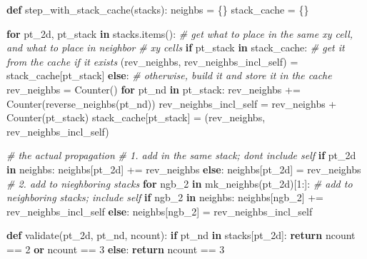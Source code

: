 \documentclass[]{article}
\newenvironment{Shaded}{}{}
\newcommand{\CommentTok}[1]{\textcolor[rgb]{0.38,0.63,0.69}{\textit{#1}}}
\newcommand{\ControlFlowTok}[1]{\textcolor[rgb]{0.00,0.44,0.13}{\textbf{#1}}}
\newcommand{\DecValTok}[1]{\textcolor[rgb]{0.25,0.63,0.44}{#1}}
\newcommand{\KeywordTok}[1]{\textcolor[rgb]{0.00,0.44,0.13}{\textbf{#1}}}
\newcommand{\NormalTok}[1]{#1}
\newcommand{\OperatorTok}[1]{\textcolor[rgb]{0.40,0.40,0.40}{#1}}
\begin{document}
\begin{Shaded}
\begin{Highlighting}[]
\KeywordTok{def}\NormalTok{ step\_with\_stack\_cache(stacks):}
\NormalTok{    neighbs }\OperatorTok{=}\NormalTok{ \{\}}
\NormalTok{    stack\_cache }\OperatorTok{=}\NormalTok{ \{\}}

    \ControlFlowTok{for}\NormalTok{ pt\_2d, pt\_stack }\KeywordTok{in}\NormalTok{ stacks.items():}
        \CommentTok{\# get what to place in the same xy cell, and what to place in neighbor}
        \CommentTok{\# xy cells}
        \ControlFlowTok{if}\NormalTok{ pt\_stack }\KeywordTok{in}\NormalTok{ stack\_cache:}
            \CommentTok{\# get it from the cache if it exists}
\NormalTok{            (rev\_neighbs, rev\_neighbs\_incl\_self) }\OperatorTok{=}\NormalTok{ stack\_cache[pt\_stack]}
        \ControlFlowTok{else}\NormalTok{:}
            \CommentTok{\# otherwise, build it and store it in the cache}
\NormalTok{            rev\_neighbs }\OperatorTok{=}\NormalTok{ Counter()}
            \ControlFlowTok{for}\NormalTok{ pt\_nd }\KeywordTok{in}\NormalTok{ pt\_stack:}
\NormalTok{                rev\_neighbs }\OperatorTok{+=}\NormalTok{ Counter(reverse\_neighbs(pt\_nd))}
\NormalTok{            rev\_neighbs\_incl\_self }\OperatorTok{=}\NormalTok{ rev\_neighbs }\OperatorTok{+}\NormalTok{ Counter(pt\_stack)}
\NormalTok{            stack\_cache[pt\_stack] }\OperatorTok{=}\NormalTok{ (rev\_neighbs, rev\_neighbs\_incl\_self)}

        \CommentTok{\# the actual propagation}
        \CommentTok{\# 1. add in the same stack; don\textquotesingle{}t include self}
        \ControlFlowTok{if}\NormalTok{ pt\_2d }\KeywordTok{in}\NormalTok{ neighbs:}
\NormalTok{            neighbs[pt\_2d] }\OperatorTok{+=}\NormalTok{ rev\_neighbs}
        \ControlFlowTok{else}\NormalTok{:}
\NormalTok{            neighbs[pt\_2d] }\OperatorTok{=}\NormalTok{ rev\_neighbs}
        \CommentTok{\# 2. add to nieghboring stacks}
        \ControlFlowTok{for}\NormalTok{ ngb\_2 }\KeywordTok{in}\NormalTok{ mk\_neighbs(pt\_2d)[}\DecValTok{1}\NormalTok{:]:}
            \CommentTok{\# add to neighboring stacks; include self}
            \ControlFlowTok{if}\NormalTok{ ngb\_2 }\KeywordTok{in}\NormalTok{ neighbs:}
\NormalTok{                neighbs[ngb\_2] }\OperatorTok{+=}\NormalTok{ rev\_neighbs\_incl\_self}
            \ControlFlowTok{else}\NormalTok{:}
\NormalTok{                neighbs[ngb\_2] }\OperatorTok{=}\NormalTok{ rev\_neighbs\_incl\_self}

    \KeywordTok{def}\NormalTok{ validate(pt\_2d, pt\_nd, ncount):}
        \ControlFlowTok{if}\NormalTok{ pt\_nd }\KeywordTok{in}\NormalTok{ stacks[pt\_2d]:}
            \ControlFlowTok{return}\NormalTok{ ncount }\OperatorTok{==} \DecValTok{2} \KeywordTok{or}\NormalTok{ ncount }\OperatorTok{==} \DecValTok{3}
        \ControlFlowTok{else}\NormalTok{:}
            \ControlFlowTok{return}\NormalTok{ ncount }\OperatorTok{==} \DecValTok{3}


\end{Highlighting}
\end{Shaded}
\end{document}
